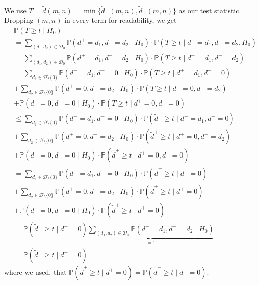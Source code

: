 \documentclass[a4paper,12pt]{article}
\theoremstyle{plain}
\theoremstyle{definition}
\theoremstyle{remark}
\begin{document}
We use $T = \tilde{d}(m, n) = \min \{ \tilde{d}^+(m, n), \tilde{d}^-(m, n) \}$ as our test statistic. Dropping $(m, n)$ in every term for readability, we get
\begin{align*}
	&\mathbb{P}(T \geq t \mid H_0) \\
	&= \sum_{(d_1, d_2) \in \mathcal{D}_0} \mathbb{P}(d^+ = d_1, d^- = d_2 \mid H_0) \cdot \mathbb{P}(T \geq t \mid d^+ = d_1, d^- = d_2, H_0) \\
	&= \sum_{(d_1, d_2) \in \mathcal{D}_0} \mathbb{P}(d^+ = d_1, d^- = d_2 \mid H_0) \cdot \mathbb{P}(T \geq t \mid d^+ = d_1, d^- = d_2) \\
	&= \sum_{d_1 \in \mathcal{D} \setminus \{ 0 \}} \mathbb{P}(d^+ = d_1, d^- = 0 \mid H_0) \cdot \mathbb{P}(T \geq t \mid d^+ = d_1, d^- = 0) \\
	&+ \sum_{d_2 \in \mathcal{D} \setminus \{ 0 \}} \mathbb{P}(d^+ = 0, d^- = d_2 \mid H_0) \cdot \mathbb{P}(T \geq t \mid d^+ = 0, d^- = d_2) \\
	&+ \mathbb{P}(d^+ = 0, d^- = 0 \mid H_0) \cdot \mathbb{P}(T \geq t \mid d^+ = 0, d^- = 0) \\
	&\leq \sum_{d_1 \in \mathcal{D} \setminus \{ 0 \}} \mathbb{P}(d^+ = d_1, d^- = 0 \mid H_0) \cdot \mathbb{P}(\tilde{d}^- \geq t \mid d^+ = d_1, d^- = 0) \\
	&+ \sum_{d_2 \in \mathcal{D} \setminus \{ 0 \}} \mathbb{P}(d^+ = 0, d^- = d_2 \mid H_0) \cdot \mathbb{P}(\tilde{d}^+ \geq t \mid d^+ = 0, d^- = d_2) \\
	&+ \mathbb{P}(d^+ = 0, d^- = 0 \mid H_0) \cdot \mathbb{P}(\tilde{d}^+ \geq t \mid d^+ = 0, d^- = 0) \\
	&= \sum_{d_1 \in \mathcal{D} \setminus \{ 0 \}} \mathbb{P}(d^+ = d_1, d^- = 0 \mid H_0) \cdot \mathbb{P}(\tilde{d}^- \geq t \mid d^- = 0) \\
	&+ \sum_{d_2 \in \mathcal{D} \setminus \{ 0 \}} \mathbb{P}(d^+ = 0, d^- = d_2 \mid H_0) \cdot \mathbb{P}(\tilde{d}^+ \geq t \mid d^+ = 0) \\
	&+ \mathbb{P}(d^+ = 0, d^- = 0 \mid H_0) \cdot \mathbb{P}(\tilde{d}^+ \geq t \mid d^+ = 0) \\
	&= \mathbb{P}(\tilde{d}^+ \geq t \mid d^+ = 0) \underbrace{\sum_{(d_1, d_2) \in \mathcal{D}_0} \mathbb{P}(d^+ = d_1, d^- = d_2 \mid H_0)}_{= 1} \\
	&= \mathbb{P}(\tilde{d}^+ \geq t \mid d^+ = 0)
\end{align*}
where we used, that $\mathbb{P}(\tilde{d}^+ \geq t \mid d^+ = 0) = \mathbb{P}(\tilde{d}^- \geq t \mid d^- = 0)$.
\end{document}
